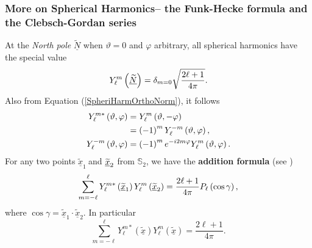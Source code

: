 \documentclass[preprint,11pt,a4paper]{elsarticle}
\begin{document}
\subsubsection{More on Spherical Harmonics-- the Funk-Hecke formula and the
Clebsch-Gordan series}

At the \textit{North pole} $\underline{\widetilde{N}}$ when $\vartheta=0$
and $\varphi$ arbitrary, all spherical harmonics have the special value 
\begin{equation}
Y_{\ell}^{m}\left( \underline{\widetilde{N}}\right) =\delta_{m=0}\sqrt {%
\frac{2\ell+1}{4\pi}}.  \label{Y_North}
\end{equation}
Also from Equation (\ref{SpheriHarmOrthoNorm}), it follows%
\begin{align}
Y_{\ell}^{m\ast}\left( \vartheta,\varphi\right) & =Y_{\ell}^{m}\left(
\vartheta,-\varphi\right)  \label{Y_conjugate} \\
& =\left( -1\right) ^{m}Y_{\ell}^{-m}\left( \vartheta,\varphi\right) , 
\notag \\
Y_{\ell}^{-m}\left( \vartheta,\varphi\right) & =\left( -1\right)
^{m}e^{-i2m\varphi}Y_{\ell}^{m}\left( \vartheta,\varphi\right) .  \notag
\end{align}
For any two points $\underline{\widetilde{x}}_{1}\ $and $\underline{%
\widetilde{x}}_{2}$ from $\mathbb{S}_{2}$, we have the \textbf{addition
formula} (see \cite{Varshalovich1988}) 
\begin{equation}
\sum_{m=-\ell}^{\ell}Y_{\ell}^{m\ast}\left( \underline{\widetilde{x}}%
_{1}\right) Y_{\ell}^{m}\left( \underline{\widetilde{x}}_{2}\right) =\frac{%
2\ell+1}{4\pi}P_{\ell}\left( \cos\gamma\right) ,  \label{FormulaAddition}
\end{equation}
where $\cos\gamma=\underline{\widetilde{x}}_{1}\cdot\underline{\widetilde{x}}%
_{2}$. In particular 
\begin{equation}
\sum_{m=-\ell}^{\ell}Y_{\ell}^{m\ast}\left( \underline{\widetilde{x}}\right)
Y_{\ell}^{m}\left( \underline{\widetilde{x}}\right) =\frac{2\ell+1}{4\pi}.
\label{Ylm_Sum_L}
\end{equation}
\end{document}
